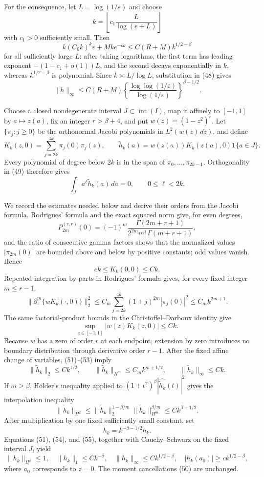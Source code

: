 For the consequence, let \(L=\log(1/\varepsilon)\) and choose
\[
k=\left\lfloor c_1\frac{L}{\log(e+L)}\right\rfloor
\]
with \(c_1>0\) sufficiently small.  Then
\[
k(C_0k)^k\varepsilon+Mk e^{-ck}
\le C(R+M)k^{1/2-\beta}
\]
for all sufficiently large \(L\): after taking logarithms, the first term has leading exponent \(-(1-c_1+o(1))L\), and the second decays exponentially in \(k\), whereas \(k^{1/2-\beta}\) is polynomial.  Since \(k\asymp L/\log L\), substitution in (48) gives
\[
\|h\|_\infty
\le C(R+M)
\left\{\frac{\log\log(1/\varepsilon)}{\log(1/\varepsilon)}\right\}^{\beta-1/2}.
\]

Choose a closed nondegenerate interval \(J\subset\operatorname{int}(I)\), map it affinely to \([-1,1]\) by \(a\mapsto z(a)\), fix an integer \(r>\beta+4\), and put \(w(z)=(1-z^2)^r\).  Let \(\{\pi_j:j\ge0\}\) be the orthonormal Jacobi polynomials in \(L^2(w(z)\,dz)\), and define
\[
K_k(z,0)=\sum_{j=2k}^{4k}\pi_j(0)\pi_j(z),
\qquad
\widetilde h_k(a)=w(z(a))K_k(z(a),0)\mathbf 1\{a\in J\}. \tag{49}
\]
Every polynomial of degree below \(2k\) is in the span of \(\pi_0,\ldots,\pi_{2k-1}\).  Orthogonality in (49) therefore gives
\[
\int_J a^\ell\widetilde h_k(a)\,da=0,
\qquad 0\le\ell<2k. \tag{50}
\]

We record the estimates needed below and derive their orders from the Jacobi formula.  Rodrigues' formula and the exact squared norm give, for even degrees,
\[
P_{2m}^{(r,r)}(0)
=(-1)^m\frac{\Gamma(2m+r+1)}{2^{2m}m!\,\Gamma(m+r+1)},
\]
and the ratio of consecutive gamma factors shows that the normalized values \(|\pi_{2m}(0)|\) are bounded above and below by positive constants; odd values vanish.  Hence
\[
c k\le K_k(0,0)\le Ck. \tag{51}
\]
Repeated integration by parts in Rodrigues' formula gives, for every fixed integer \(m\le r-1\),
\[
\|\partial_z^m\{wK_k(\cdot,0)\}\|_2^2
\le C_m\sum_{j=2k}^{4k}(1+j)^{2m}|\pi_j(0)|^2
\le C_m k^{2m+1}. \tag{52}
\]
The same factorial-product bounds in the Christoffel--Darboux identity give
\[
\sup_{z\in[-1,1]}|w(z)K_k(z,0)|\le Ck. \tag{53}
\]
Because \(w\) has a zero of order \(r\) at each endpoint, extension by zero introduces no boundary distribution through derivative order \(r-1\).  After the fixed affine change of variables, (51)--(53) imply
\[
\|\widetilde h_k\|_2\le Ck^{1/2},
\qquad
\|\widetilde h_k\|_{H^m}\le C_mk^{m+1/2},
\qquad
\|\widetilde h_k\|_\infty\le Ck. \tag{54}
\]
If \(m>\beta\), Hölder's inequality applied to
\((1+t^2)^\beta|\widehat{\widetilde h_k}(t)|^2\) gives the interpolation inequality
\[
\|\widetilde h_k\|_{H^\beta}
\le\|\widetilde h_k\|_2^{1-\beta/m}
\|\widetilde h_k\|_{H^m}^{\beta/m}
\le Ck^{\beta+1/2}. \tag{55}
\]
After multiplication by one fixed sufficiently small constant, set
\[
h_k=k^{-\beta-1/2}\widetilde h_k.
\]
Equations (51), (54), and (55), together with Cauchy--Schwarz on the fixed interval \(J\), yield
\[
\|h_k\|_{H^\beta}\le1,
\quad \|h_k\|_1\le Ck^{-\beta},
\quad \|h_k\|_\infty\le Ck^{1/2-\beta},
\quad |h_k(a_0)|\ge ck^{1/2-\beta}, \tag{56}
\]
where \(a_0\) corresponds to \(z=0\).  The moment cancellations (50) are unchanged.

